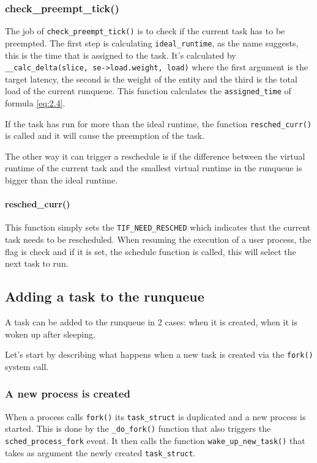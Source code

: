 \documentclass[10pt, oneside]{book}
\begin{document}
\subsubsection{check\_preempt\_tick()}

The job of \verb|check_preempt_tick()| is to check if the current task has to be preempted. The first step is calculating \verb|ideal_runtime|, as the name suggests, this is the time that is assigned to the task. It's calculated by \newline \verb|__calc_delta(slice, se->load.weight, load)| where the first argument is the target latency, the second is the weight of the entity and the third is the total load of the current runqueue. This function calculates the \verb|assigned_time| of formula \ref{eq:2.4}.

If the task has run for more than the ideal runtime, the function \verb|resched_curr()| is called and it will cause the preemption of the task.

The other way it can trigger a reschedule is if the difference between the virtual runtime of the current task and the smallest virtual runtime in the runqueue is bigger than the ideal runtime.

\paragraph{resched\_curr()}\label{resched_curr}
This function simply sets the \verb|TIF_NEED_RESCHED| which indicates that the current task needs to be rescheduled. When resuming the execution of a user process, the flag is check and if it is set, the schedule function is called, this will select the next task to run.

  


\subsection{Adding a task to the runqueue}

A task can be added to the runqueue in 2 cases: when it is created, when it is woken up after sleeping.

Let's start by describing what happens when a new task is created via the \verb|fork()| system call.

\subsubsection{A new process is created}
When a process calls \verb|fork()| its \verb|task_struct| is duplicated and a new process is started. This is done by the \verb|_do_fork()| function that also triggers the \verb|sched_process_fork|\label{trace:sched_process_fork} event. It then calls the function \verb|wake_up_new_task()| that takes as argument the newly created \verb|task_struct|.
\end{document}
